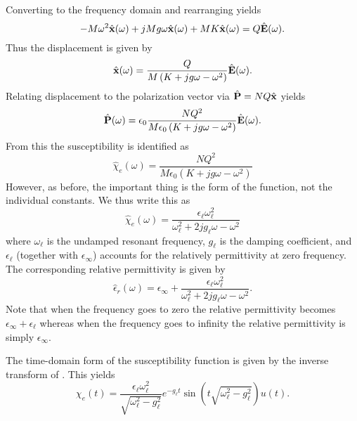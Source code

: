 Converting to the frequency domain and rearranging yields
\begin{equation}
  -M\omega^2\hat{\mathbf{x}}(\omega) + 
  jMg\omega\hat{\mathbf{x}}(\omega) + MK \hat{\mathbf{x}}(\omega)
  = Q\hat{\mathbf{E}}(\omega).
\end{equation}
Thus the displacement is given by 
\begin{equation}
  \hat{\mathbf{x}}(\omega) = 
   \frac{Q}{M\left(K + jg\omega - \omega^2 \right)}\hat{\mathbf{E}}(\omega).
\end{equation}
Relating displacement to the polarization vector via $\hat{\mathbf{P}} =
NQ\hat{\mathbf{x}}$ yields
\begin{equation}
  \hat{\mathbf{P}}(\omega) = 
   \epsilon_0\frac{NQ^2}
        {M\epsilon_0\left(K + jg\omega - \omega^2 \right)}
        \hat{\mathbf{E}}(\omega).
\end{equation}
From this the susceptibility is identified as
\begin{equation}
 \hat{\chi}_e(\omega) = 
     \frac{NQ^2}
        {M\epsilon_0\left(K + jg\omega - \omega^2 \right)}
\end{equation}
However, as before, the important thing is the form of the function,
not the individual constants.  We thus write this as
\begin{equation}
 \hat{\chi}_e(\omega) = 
     \frac{\epsilon_\ell\omega^2_\ell}
        {\omega^2_\ell + 2 j g_\ell \omega - \omega^2}
 \label{eq:lorentzOmega}
\end{equation}
where $\omega_\ell$ is the undamped resonant frequency, $g_\ell$ is
the damping coefficient, and $\epsilon_\ell$ (together with
$\epsilon_\infty$) accounts for the relatively permittivity at zero
frequency.  The corresponding relative permittivity is given by
\begin{equation}
   \hat{\epsilon}_r(\omega) = \epsilon_\infty + 
     \frac{\epsilon_\ell\omega^2_\ell}
        {\omega^2_\ell + 2 j g_\ell \omega - \omega^2}.
\end{equation}
Note that when the frequency goes to zero the relative permittivity
becomes $\epsilon_\infty + \epsilon_\ell$ whereas when the frequency
goes to infinity the relative permittivity is simply $\epsilon_\infty$.

The time-domain form of the susceptibility function is given by the
inverse transform of .  This yields
\begin{equation}
 \chi_e(t) = 
    \frac{\epsilon_\ell \omega^2_\ell}
    {\sqrt{\omega^2_\ell-g^2_\ell}} e^{-g_\ell t}
    \sin\!\left(t \sqrt{\omega^2_\ell-g^2_\ell}\right)u(t).
\end{equation}


